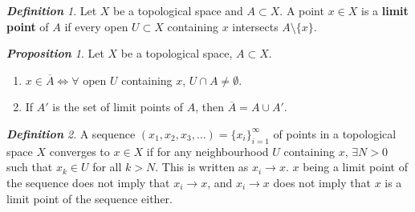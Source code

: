 \documentclass[frenchspacing,9pt,landscape,a4paper]{article}
\theoremstyle{remark}
\newtheorem*{defn}{\textbf{Definition}}
\newtheorem*{prop}{\textbf{Proposition}}
\begin{document}
\begin{multicols}{4}
\begin{defn}
    Let $X$ be a topological space and  $A\subset X$. A point  $x\in X$ is a \textbf{limit point} of  $A$
    if every open  $U\subset X$ containing  $x$ intersects  $A\setminus\{x\}$.
\end{defn}
\begin{prop}
    Let $X$ be a topological space,  $A\subset X$.
     \begin{enumerate}
         \item $x\in\overline{A}\iff\forall$ open  $U$ containing  $x$,  $U\cap A\neq\emptyset$.
         \item If  $A'$ is the set of limit points of  $A$, then  $\overline{A}=A\cup A'$.
    \end{enumerate}
\end{prop}
\begin{defn}
    A sequence $(x_1,x_2,x_3,\dots)=\{x_i\}_{i=1}^\infty$ of points in a topological space $X$ converges to
     $x\in X$ if for any neighbourhood  $U$ containing  $x$,  $\exists N>0$ such that  $x_k\in U$ for all 
     $k>N$. This is written as  $x_i\to x$.  $x$ being a limit point of the sequence does not imply that
     $x_i\to x$, and  $x_i\to x$ does not imply that  $x$ is a limit point of the sequence either.
\end{defn}

\end{multicols}
\end{document}
